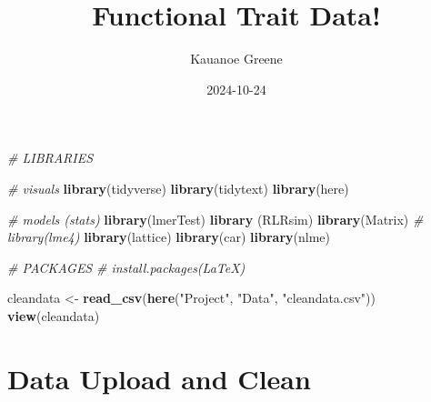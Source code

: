 \documentclass[
]{article}
\title{Functional Trait Data!}
\author{Kauanoe Greene}
\date{2024-10-24}
\newenvironment{Shaded}{\begin{snugshade}}{\end{snugshade}}
\newcommand{\CommentTok}[1]{\textcolor[rgb]{0.56,0.35,0.01}{\textit{#1}}}
\newcommand{\FunctionTok}[1]{\textcolor[rgb]{0.13,0.29,0.53}{\textbf{#1}}}
\newcommand{\NormalTok}[1]{#1}
\newcommand{\OtherTok}[1]{\textcolor[rgb]{0.56,0.35,0.01}{#1}}
\newcommand{\StringTok}[1]{\textcolor[rgb]{0.31,0.60,0.02}{#1}}
\begin{document}
\maketitle

{
\setcounter{tocdepth}{2}
\tableofcontents
}
\begin{Shaded}
\begin{Highlighting}[]
\CommentTok{\# LIBRARIES}

\CommentTok{\# visuals}
\FunctionTok{library}\NormalTok{(tidyverse)}
\FunctionTok{library}\NormalTok{(tidytext)}
\FunctionTok{library}\NormalTok{(here)}

\CommentTok{\# models (stats)}
\FunctionTok{library}\NormalTok{(lmerTest)}
\FunctionTok{library}\NormalTok{ (RLRsim)}
\FunctionTok{library}\NormalTok{(Matrix)}
\CommentTok{\# library(lme4)}
\FunctionTok{library}\NormalTok{(lattice)}
\FunctionTok{library}\NormalTok{(car)}
\FunctionTok{library}\NormalTok{(nlme)}

\CommentTok{\# PACKAGES}
\CommentTok{\# install.packages(LaTeX)}
\end{Highlighting}
\end{Shaded}

\begin{Shaded}
\begin{Highlighting}[]
\NormalTok{cleandata }\OtherTok{\textless{}{-}} \FunctionTok{read\_csv}\NormalTok{(}\FunctionTok{here}\NormalTok{(}\StringTok{"Project"}\NormalTok{, }\StringTok{"Data"}\NormalTok{, }\StringTok{"cleandata.csv"}\NormalTok{))}
\FunctionTok{view}\NormalTok{(cleandata)}
\end{Highlighting}
\end{Shaded}

\section{Data Upload and Clean}\label{data-upload-and-clean}
\end{document}

